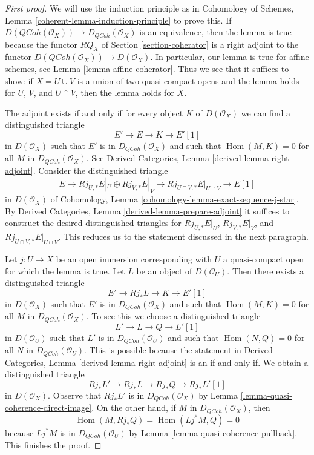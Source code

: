 \documentclass{stacks-project}
\theoremstyle{plain}
\theoremstyle{definition}
\theoremstyle{remark}
\numberwithin{equation}{subsection}
\def\Hom{\mathop{\mathrm{Hom}}\nolimits}
\def\QCoh{\mathit{QCoh}}
\begin{document}
\begin{proof}[First proof]
We will use the induction principle as in
Cohomology of Schemes, Lemma \ref{coherent-lemma-induction-principle}
to prove this. If $D(\QCoh(\mathcal{O}_X)) \to D_\QCoh(\mathcal{O}_X)$
is an equivalence, then the lemma is true because the functor
$RQ_X$ of Section \ref{section-coherator} is a right adjoint to the functor
$D(\QCoh(\mathcal{O}_X)) \to D(\mathcal{O}_X)$.
In particular, our lemma is true for affine schemes, see
Lemma \ref{lemma-affine-coherator}.
Thus we see that it suffices to show: if $X = U \cup V$
is a union of two quasi-compact opens and the
lemma holds for $U$, $V$, and $U \cap V$, then the lemma holds for $X$.

\medskip\noindent
The adjoint exists if and only if for every object $K$ of
$D(\mathcal{O}_X)$ we can find a distinguished triangle
$$
E' \to E \to K \to E'[1]
$$
in $D(\mathcal{O}_X)$
such that $E'$ is in $D_\QCoh(\mathcal{O}_X)$ and such that
$\Hom(M, K) = 0$ for all $M$ in $D_\QCoh(\mathcal{O}_X)$. See
Derived Categories, Lemma \ref{derived-lemma-right-adjoint}.
Consider the distinguished triangle
$$
E \to Rj_{U, *}E|_U \oplus Rj_{V, *}E|_V \to
Rj_{U \cap V, *}E|_{U \cap V} \to E[1]
$$
in $D(\mathcal{O}_X)$ of
Cohomology, Lemma \ref{cohomology-lemma-exact-sequence-j-star}.
By Derived Categories, Lemma \ref{derived-lemma-prepare-adjoint}
it suffices to construct the desired distinguished triangles
for $Rj_{U, *}E|_U$, $Rj_{V, *}E|_V$, and
$Rj_{U \cap V, *}E|_{U \cap V}$. This reduces us to the statement
discussed in the next paragraph.

\medskip\noindent
Let $j : U \to X$ be an open immersion corresponding with $U$ a quasi-compact
open for which the lemma is true. Let $L$ be an object of $D(\mathcal{O}_U)$.
Then there exists a distinguished triangle
$$
E' \to Rj_*L \to K \to E'[1]
$$
in $D(\mathcal{O}_X)$
such that $E'$ is in $D_\QCoh(\mathcal{O}_X)$ and such that
$\Hom(M, K) = 0$ for all $M$ in $D_\QCoh(\mathcal{O}_X)$.
To see this we choose a distinguished triangle
$$
L' \to L \to Q \to L'[1]
$$
in $D(\mathcal{O}_U)$ such that $L'$ is in $D_\QCoh(\mathcal{O}_U)$
and such that $\Hom(N, Q) = 0$ for all $N$ in $D_\QCoh(\mathcal{O}_U)$.
This is possible because the statement in
Derived Categories, Lemma \ref{derived-lemma-right-adjoint}
is an if and only if.
We obtain a distinguished triangle
$$
Rj_*L' \to Rj_*L \to Rj_*Q \to Rj_*L'[1]
$$
in $D(\mathcal{O}_X)$. Observe that $Rj_*L'$ is in $D_\QCoh(\mathcal{O}_X)$
by Lemma \ref{lemma-quasi-coherence-direct-image}.
On the other hand, if $M$ in $D_\QCoh(\mathcal{O}_X)$, then
$$
\Hom(M, Rj_*Q) = \Hom(Lj^*M, Q) = 0
$$
because $Lj^*M$ is in $D_\QCoh(\mathcal{O}_U)$ by
Lemma \ref{lemma-quasi-coherence-pullback}.
This finishes the proof.
\end{proof}
\end{document}
